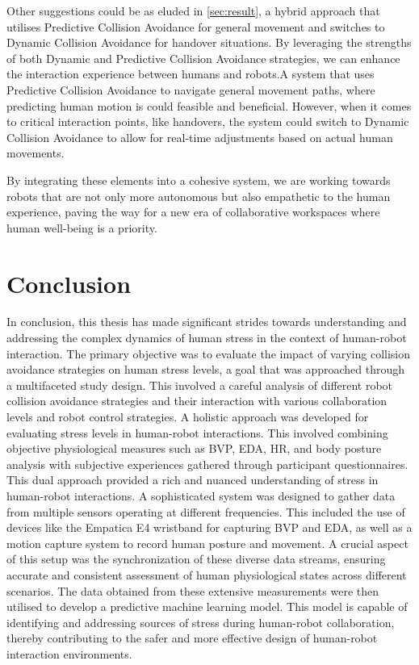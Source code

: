 Other suggestions could be as eluded in \autoref{sec:result}, a hybrid approach that utilises Predictive Collision Avoidance for general movement and switches to Dynamic Collision Avoidance for handover situations. By leveraging the strengths of both Dynamic and Predictive Collision Avoidance strategies, we can enhance the interaction experience between humans and robots.A system that uses Predictive Collision Avoidance to navigate general movement paths, where predicting human motion is could feasible and beneficial. However, when it comes to critical interaction points, like handovers, the system could switch to Dynamic Collision Avoidance to allow for real-time adjustments based on actual human movements.


By integrating these elements into a cohesive system, we are working towards robots that are not only more autonomous but also empathetic to the human experience, paving the way for a new era of collaborative workspaces where human well-being is a priority.




\section{Conclusion}

In conclusion, this thesis has made significant strides towards understanding and addressing the complex dynamics of human stress in the context of human-robot interaction. The primary objective was to evaluate the impact of varying collision avoidance strategies on human stress levels, a goal that was approached through a multifaceted study design. This involved a careful analysis of different robot collision avoidance strategies and their interaction with various collaboration levels and robot control strategies.
A holistic approach was developed for evaluating stress levels in human-robot interactions. This involved combining objective physiological measures such as BVP, EDA, HR, and body posture analysis with subjective experiences gathered through participant questionnaires. This dual approach provided a rich and nuanced understanding of stress in human-robot interactions.
A sophisticated system was designed to gather data from multiple sensors operating at different frequencies. This included the use of devices like the Empatica E4 wristband for capturing BVP and EDA, as well as a motion capture system to record human posture and movement. A crucial aspect of this setup was the synchronization of these diverse data streams, ensuring accurate and consistent assessment of human physiological states across different scenarios.
The data obtained from these extensive measurements were then utilised to develop a predictive machine learning model. This model is capable of identifying and addressing sources of stress during human-robot collaboration, thereby contributing to the safer and more effective design of human-robot interaction environments.

